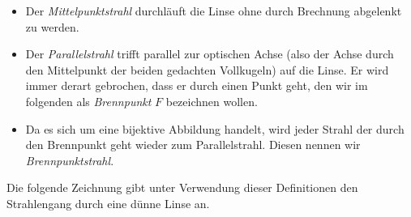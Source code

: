 \documentclass[a4paper,german,12pt,smallheadings]{scrartcl}
\begin{document}
\begin{itemize}
  \item Der \textit{Mittelpunktstrahl} durchläuft die Linse ohne durch
    Brechnung abgelenkt zu werden.
  \item Der \textit{Parallelstrahl} trifft parallel zur optischen Achse (also
    der Achse durch den Mittelpunkt der beiden gedachten Vollkugeln) auf die
    Linse. Er wird immer derart gebrochen, dass er durch einen Punkt geht, den
    wir im folgenden als \textit{Brennpunkt} $F$ bezeichnen wollen.
  \item Da es sich um eine bijektive Abbildung handelt, wird jeder Strahl der
    durch den Brennpunkt geht wieder zum Parallelstrahl. Diesen nennen wir
    \textit{Brennpunktstrahl}.
\end{itemize}


Die folgende Zeichnung gibt unter Verwendung dieser Definitionen den
Strahlengang durch eine dünne Linse an.


\end{document}
